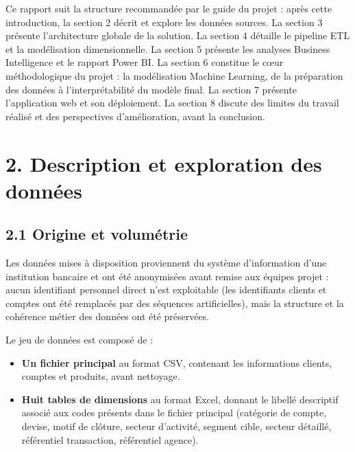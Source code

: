 \documentclass[11pt,a4paper]{article}
\providecommand{\tightlist}{\setlength{\itemsep}{0pt}\setlength{\parskip}{0pt}}
\begin{document}
Ce rapport suit la structure recommandée par le guide du projet : après
cette introduction, la section 2 décrit et explore les données sources.
La section 3 présente l'architecture globale de la solution. La section
4 détaille le pipeline ETL et la modélisation dimensionnelle. La section
5 présente les analyses Business Intelligence et le rapport Power BI. La
section 6 constitue le cœur méthodologique du projet : la modélisation
Machine Learning, de la préparation des données à l'interprétabilité du
modèle final. La section 7 présente l'application web et son
déploiement. La section 8 discute des limites du travail réalisé et des
perspectives d'amélioration, avant la conclusion.

\newpage

\hypertarget{description-et-exploration-des-donnuxe9es}{%
\section{2. Description et exploration des
données}\label{description-et-exploration-des-donnuxe9es}}

\hypertarget{origine-et-volumuxe9trie}{%
\subsection{2.1 Origine et volumétrie}\label{origine-et-volumuxe9trie}}

Les données mises à disposition proviennent du système d'information
d'une institution bancaire et ont été anonymisées avant remise aux
équipes projet : aucun identifiant personnel direct n'est exploitable
(les identifiants clients et comptes ont été remplacés par des séquences
artificielles), mais la structure et la cohérence métier des données ont
été préservées.

Le jeu de données est composé de :

\begin{itemize}
\tightlist
\item
  \textbf{Un fichier principal} au format CSV, contenant les
  informations clients, comptes et produits, avant nettoyage.
\item
  \textbf{Huit tables de dimensions} au format Excel, donnant le libellé
  descriptif associé aux codes présents dans le fichier principal
  (catégorie de compte, devise, motif de clôture, secteur d'activité,
  segment cible, secteur détaillé, référentiel transaction, référentiel
  agence).
\end{itemize}
\end{document}
